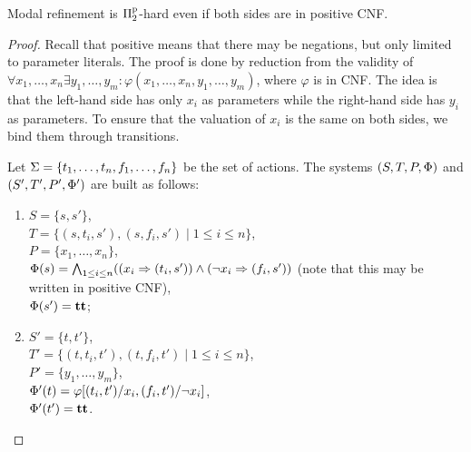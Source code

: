 \begin{proposition}\label{p:lcrc}
Modal refinement is $\mathrm\Pi^\mathrm p_2$-hard even if both sides are in positive CNF.
\end{proposition}
\begin{proof}
Recall that positive means that there may be negations, but only limited
to parameter literals.
The proof is done by reduction from the validity of \linebreak  
$\forall x_1, \ldots, x_n \exists y_1, \ldots, y_m : 
\varphi(x_1, \ldots, x_n, y_1, \ldots, y_m)$, where $\varphi$ is in CNF.
The idea is that the left-hand side has only $x_i$ as parameters
while the right-hand side has $y_i$ as parameters.
To ensure that the valuation of $x_i$ is the same
on both sides, we bind them through transitions.

Let 
$\mathrm{\Sigma} = \{t_1, \ldots, t_n, f_1, \ldots, f_n\}$
be the set of actions.
The systems $(S,T,P,\mathrm{\Phi})$ and $(S',T',P',\mathrm{\Phi}')$ are built as follows: 
\begin{enumerate}
    \item $S = \{s, s'\}$,\\ 
    $T = \{(s,t_i,s'), (s,f_i,s') \mid
1 \le i \le n \}$,\\ 
    $P = \{x_1, \ldots, x_n\}$,\\
    $\mathrm{\Phi}(s) = \bigwedge_{1 \le i \le n} ((x_i \Rightarrow (t_i,s')) \wedge (\neg x_i \Rightarrow (f_i,s'))$ (note that this may be written in positive CNF),\\
    $\mathrm{\Phi}(s') = \mathbf{tt}$;
    \item $S' = \{ t, t' \}$,\\
    $T' = \{ (t,t_i,t'), (t,f_i,t') \mid 1 \le i \le n \}$,\\
    $P' = \{y_1, \ldots, y_m\}$,\\
    $\mathrm{\Phi}'(t) = \varphi[(t_i,t')/x_i,(f_i,t')/\neg x_i]$,\\
    $\mathrm{\Phi}'(t') = \mathbf{tt}$.
\end{enumerate}

%


\end{proof}
